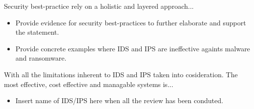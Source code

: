 Security best-practice rely on a holistic and layered approach...

\begin{followup}[to-do]
    \begin{itemize}
        \item Provide evidence for security best-practices to further elaborate and support the statement.
        \item Provide concrete examples where IDS and IPS are ineffective againts malware and ransomware.
    \end{itemize}
\end{followup}

With all the limitations inherent to IDS and IPS taken into cosideration. The most effective, cost effective and managable systems is...

\begin{followup}[to-do]
    \begin{itemize}
        \item Insert name of IDS/IPS here when all the review has been conduted.
    \end{itemize}
\end{followup}